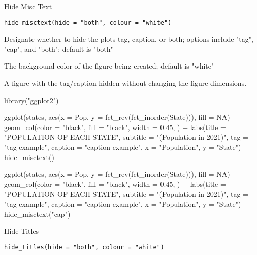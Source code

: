 \documentclass[a4paper]{book}
\begin{document}
%
\begin{Description}\relax
Hide Misc Text
\end{Description}
%
\begin{Usage}
\begin{verbatim}
hide_misctext(hide = "both", colour = "white")
\end{verbatim}
\end{Usage}
%
\begin{Arguments}
\begin{ldescription}
\item[\code{hide}] Designate whether to hide the plots tag, caption, or both; options include "tag", "cap", and "both"; default is "both"

\item[\code{colour}] The background color of the figure being created; default is "white"
\end{ldescription}
\end{Arguments}
%
\begin{Value}
A figure with the tag/caption hidden without changing the figure dimensions.
\end{Value}
%
\begin{Examples}
\begin{ExampleCode}
library("ggplot2")

ggplot(states, aes(x = Pop, y = fct_rev(fct_inorder(State))), fill = NA) +
geom_col(color = "black", fill = "black", width = 0.45, ) +
labs(title = "POPULATION OF EACH STATE",
    subtitle = "(Population in 2021)",
    tag = "tag example",
    caption = "caption example",
    x = "Population",
    y = "State") +
hide_misctext()

ggplot(states, aes(x = Pop, y = fct_rev(fct_inorder(State))), fill = NA) +
geom_col(color = "black", fill = "black", width = 0.45, ) +
labs(title = "POPULATION OF EACH STATE",
    subtitle = "(Population in 2021)",
    tag = "tag example",
    caption = "caption example",
    x = "Population",
    y = "State") +
hide_misctext("cap")
\end{ExampleCode}
\end{Examples}
%
\begin{Description}\relax
Hide Titles
\end{Description}
%
\begin{Usage}
\begin{verbatim}
hide_titles(hide = "both", colour = "white")
\end{verbatim}
\end{Usage}
\end{document}
